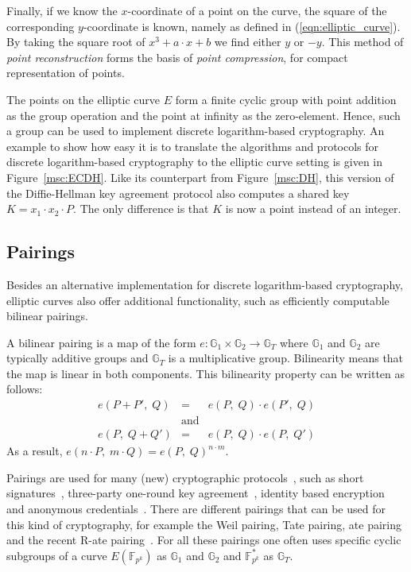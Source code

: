 Finally, if we know the $x$-coordinate of a point on the curve, the square of
the corresponding $y$-coordinate is known, namely as defined in
(\ref{eqn:elliptic_curve}). By taking the square root of $x^{3} + a \cdot x + b$ we
find either $y$ or $-y$. This method of \emph{point reconstruction} forms the
basis of \emph{point compression}, for compact representation of points.

The points on the elliptic curve $E$ form a finite cyclic group with point
addition as the group operation and the point at infinity as the zero-element.
Hence, such a group can be used to implement discrete logarithm-based
cryptography. An example to show how easy it is to translate the algorithms and
protocols for discrete logarithm-based cryptography to the elliptic curve
setting is given in Figure~\ref{msc:ECDH}. Like its counterpart from
Figure~\ref{msc:DH}, this version of the Diffie-Hellman key agreement protocol
also computes a shared key $K = x_1 \cdot x_2 \cdot P$. The only difference is
that $K$ is now a point instead of an integer.

\subsection{Pairings\label{sec:pairings}}

Besides an alternative implementation for discrete logarithm-based cryptography,
elliptic curves also offer additional functionality, such as efficiently
computable bilinear pairings.

A bilinear pairing is a map of the form $e: \mathbb{G}_1 \times \mathbb{G}_2 \to
\mathbb{G}_T$ where $\mathbb{G}_1$ and $\mathbb{G}_2$ are typically additive
groups and $\mathbb G_T$ is a multiplicative group. Bilinearity means that the
map is linear in both components. This bilinearity property can be written as
follows:
\begin{equation*}
  \begin{array}{rcl}
    e(P + P',\; Q) & = & e(P,\; Q)\cdot e(P',\; Q) \\
     & \text{and} & \\
    e(P,\; Q + Q') & = & e(P,\; Q)\cdot e(P,\; Q')
  \end{array}
\end{equation*}
As a result, $e(n\cdot P,\; m\cdot Q) = e(P,\; Q)^{n \cdot m}$.

Pairings are used for many (new) cryptographic protocols~\cite{BSS05}, such as
short signatures~\cite{BonehLS04}, three-party one-round key
agreement~\cite{Joux04}, identity based encryption~\cite{BonehFranklin01} and
anonymous credentials~\cite{CamenischLysyanskaya04}. There are different
pairings that can be used for this kind of cryptography, for example the Weil
pairing, Tate pairing, ate pairing and the recent R-ate pairing~\cite{Vercauteren09}.
For all these pairings one often uses specific cyclic subgroups of a curve
$E(\mathbb{F}_{p^k})$ as $\mathbb{G}_1$ and $\mathbb{G}_2$ and
$\mathbb{F}_{p^k}^*$ as $\mathbb{G}_T$.

